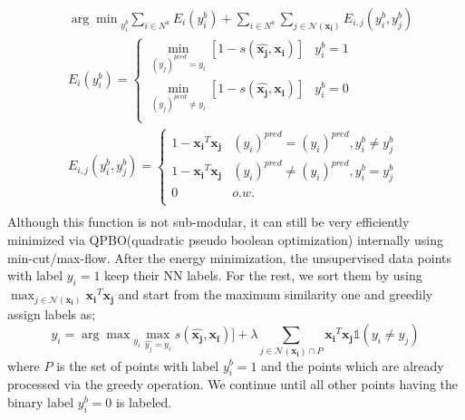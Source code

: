  \begin{equation}
 \begin{aligned}
&{\arg\min}_{y^b_i}  \sum_{i \in N^u} E_i(y^b_i) + \sum_{i \in N^u} \sum_{j \in \mathcal{N}(\mathbf{x_i})} E_{i,j} (y^b_i, y^b_j) \\
&E_i(y^b_i) = \left\{ \begin{array}{cc} \min_{ (y_j)^{pred} = y_i} [1 - s(\mathbf{\hat{x_j}},\mathbf{x_{i}})] & y^b_i = 1
\\  \min_{ (y_j)^{pred} \neq y_i} [1 - s(\mathbf{\hat{x_j}},\mathbf{x_{i}})] & y^b_i = 0 \\
 \end{array} \right. \\
&E_{i,j}(y^b_i,y^b_j) = \left\{ \begin{array}{cc} 1 - \mathbf{x_i}^T \mathbf{x_j}  & (y_i)^{pred}=(y_i)^{pred}, y^b_i \neq y^b_j \\ 1 - \mathbf{x_i}^T \mathbf{x_j} & (y_i)^{pred} \neq (y_i)^{pred}, y^b_i = y^b_j \\ 
0 & o.w. \\ \end{array} \right. \\
\end{aligned}
 \end{equation}
Although this function is not sub-modular, it can still be very efficiently minimized via QPBO(quadratic pseudo boolean optimization)\cite{kolmogrov} internally using min-cut/max-flow. After the energy minimization, the unsupervised data points with label $y_i=1$ keep their NN labels. For the rest, we sort them by using $\max_{j \in \mathcal{N}(\mathbf{x_i})} \mathbf{x_i}^T \mathbf{x_j}$ and start from the maximum similarity one and greedily assign labels as;
\begin{equation}
y_i = {\arg\max}_{y_i}  \max_{\hat{y_j}=y_i}  s(\mathbf{\hat{x_j}},\mathbf{x_{i}})]+ \lambda  \sum_{j \in \mathcal{N}(\mathbf{x_i})\cap P}  \mathbf{x_i}^T \mathbf{x_j} \mathds{1}(y_i \neq y_j)
\end{equation}
where $P$ is the set of points with label $y^b_i=1$ and the points which are already processed via the greedy operation. We  continue until all other points having the binary label $y^b_i=0$ is labeled.

